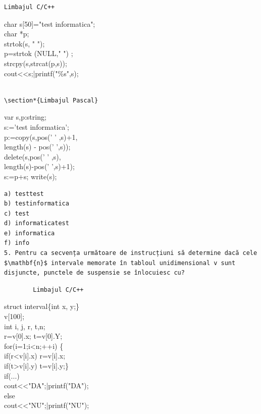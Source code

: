 \documentclass[10pt]{article}
\begin{document}
\begin{verbatim}
Limbajul C/C++
\end{verbatim}

char s[50]="test informatica";\\
char *p;\\
strtok(s, " ");\\
p=strtok (NULL," ") ;\\
strcpy(s,strcat(p,s));\\
cout<<s;|printf("\%s",s);

\begin{verbatim}

\section*{Limbajul Pascal}
\end{verbatim}

var s,p:string;\\
s:='test informatica';\\
p:=copy(s,pos(' ' ,s)+1,\\
length(s) - pos(' ',s));\\
delete(s,pos(' ' ,s),\\
length(s)-pos(' ',s)+1);\\
s:=p+s; write(s);

\begin{verbatim}
a) testtest
b) testinformatica
c) test
d) informaticatest
e) informatica
f) info
5. Pentru ca secvența următoare de instrucțiuni să determine dacă cele $\mathbf{n}$ intervale memorate în tabloul unidimensional v sunt disjuncte, punctele de suspensie se înlocuiesc cu?
\end{verbatim}

\begin{verbatim}
        Limbajul C/C++
\end{verbatim}

struct interval\{int x, y;\}\\[0pt]
v[100];\\
int i, j, r, t,n;\\[0pt]
r=v[0].x; t=v[0].Y;\\
for(i=1;i<n;++i) \{\\[0pt]
if(r<v[i].x) r=v[i].x;\\[0pt]
if(t>v[i].y) t=v[i].y;\}\\
if(...)\\
cout<<"DA";|printf("DA");\\
else\\
cout<<"NU";|printf("NU");
\end{document}
